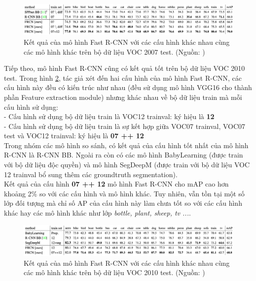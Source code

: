 {    \begin{figure}[H]
        \centering
        \includegraphics[width=15cm] {images/fast_rcnn_results_1}
        \caption{Kết quả của mô hình Fast R-CNN với các cấu hình khác nhau cùng các mô hình khác trên bộ dữ liệu VOC 2007 test. (Nguồn: \cite{girshick2015fast})}
        \label{fig:fast_rcnn_results_1}
    \end{figure}

    \noindent
    Tiếp theo, mô hình Fast R-CNN cũng có kết quả tốt trên bộ dữ liệu VOC 2010 test.
    Trong hình \ref{fig:fast_rcnn_results_2}, tác giả xét đến hai cấu hình của mô hình Fast R-CNN, các cấu hình này đều có kiến trúc như nhau (đều sử dụng mô hình VGG16 cho thành phần Feature extraction module) nhưng khác nhau về bộ dữ liệu train mà mỗi cấu hình sử dụng: \\
    - Cấu hình sử dụng bộ dữ liệu train là VOC12 trainval: ký hiệu là \textbf{12} \\
    - Cấu hình sử dụng bộ dữ liệu train là sự kết hợp giữa VOC07 trainval, VOC07 test và VOC12 trainval: ký hiệu là \textbf{07 ++ 12} \\
    Trong nhóm các mô hình so sánh, có kết quả của cấu hình tốt nhất của mô hình R-CNN là R-CNN BB.
    Ngoài ra còn có các mô hình BabyLearning (được train với bộ dữ liệu độc quyền) và mô hình SegDeepM (được train với bộ dữ liệu VOC 12 trainval bổ sung thêm các groundtruth segmentation). \\
    Kết quả của cấu hình \textbf{07 ++ 12} mô hình Fast R-CNN cho mAP cao hơn khoảng 2\% so với các cấu hình và mô hình khác.
    Tuy nhiên, vẫn tồn tại một số lớp đối tượng mà chỉ số AP của cấu hình này làm chưa tốt so với các cấu hình khác hay các mô hình khác như lớp \textit{bottle, plant, sheep, tv ...}.

    \begin{figure}[H]
        \centering
        \includegraphics[width=15cm] {images/fast_rcnn_results_2}
        \caption{Kết quả của mô hình Fast R-CNN với các cấu hình khác nhau cùng các mô hình khác trên bộ dữ liệu VOC 2010 test. (Nguồn: \cite{girshick2015fast})}
        \label{fig:fast_rcnn_results_2}
    \end{figure}

}
